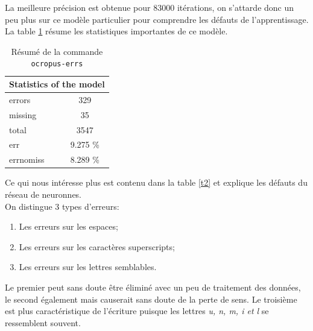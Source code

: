 \documentclass{article}
\begin{document}
La meilleure précision est obtenue pour 83000 itérations, on s'attarde donc un peu plus sur ce modèle particulier pour comprendre les défauts de l'apprentissage. La table \ref{t1} résume les statistiques importantes de ce modèle. \\

\begin{table}[!h]
    \centering
    \begin{tabular}{|l|l|lc|l|l|}
        \hline
        \multicolumn{6}{|c|}{\cellcolor[gray]{0.8}Statistics of the model}                   \\ \hline
        \multicolumn{3}{|l|}{errors}    & \multicolumn{3}{c|}{329}      \\ \hline
        \multicolumn{3}{|l|}{missing}   & \multicolumn{3}{c|}{35}       \\ \hline
        \multicolumn{3}{|l|}{total}     & \multicolumn{3}{c|}{3547}     \\ \hline
        \multicolumn{3}{|l|}{err}       & \multicolumn{3}{c|}{9.275 \%} \\ \hline
        \multicolumn{3}{|l|}{errnomiss} & \multicolumn{3}{c|}{8.289 \%} \\ \hline
    \end{tabular}
    \caption{Résumé de la commande \texttt{ocropus-errs}}
    \label{t1}
\end{table}

Ce qui nous intéresse plus est contenu dans la table \ref{t2} et explique les défauts du réseau de neuronnes. \\
On distingue 3 types d'erreurs:
\begin{enumerate}[parsep=0.1cm,itemsep=0.1cm,topsep=0.1cm]
    \item Les erreurs sur les espaces;
    \item Les erreurs sur les caractères superscripts;
    \item Les erreurs sur les lettres semblables. 
\end{enumerate}

\noindent Le premier peut sans doute être éliminé avec un peu de traitement des données, le second également mais causerait sans doute de la perte de sens. Le troisième est plus caractéristique de l'écriture puisque les lettres \textit{u, n, m, i et l} se ressemblent souvent.
\end{document}
